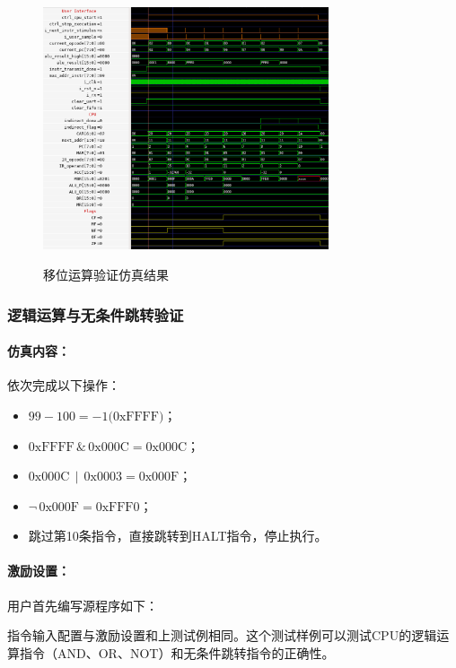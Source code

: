 \documentclass[lang=cn,a4paper,newtx]{elegantpaper}
\begin{document}
\begin{figure}[htbp]
  \centering
  \caption{移位运算验证仿真结果}
  \includegraphics[width = 0.75\textwidth]{figure/cpu_sim_shift.png}
  \label{fig:sim:3}
\end{figure}

\subsubsection{逻辑运算与无条件跳转验证}
\paragraph{仿真内容：}
依次完成以下操作：
\begin{itemize}
  \item $99 - 100 = -1 \text{(0xFFFF)}$；
  \item $\text{0xFFFF} \,\&\, \text{0x000C} = \text{0x000C}$；
  \item $\text{0x000C} \,\mid\, \text{0x0003} = \text{0x000F}$；
  \item $\neg\, \text{0x000F} = \text{0xFFF0}$；
  \item 跳过第10条指令，直接跳转到HALT指令，停止执行。
\end{itemize}

\paragraph{激励设置：}

用户首先编写源程序如下：


指令输入配置与激励设置和上测试例相同。这个测试样例可以测试CPU的逻辑运算指令（AND、OR、NOT）和无条件跳转指令的正确性。
\end{document}
